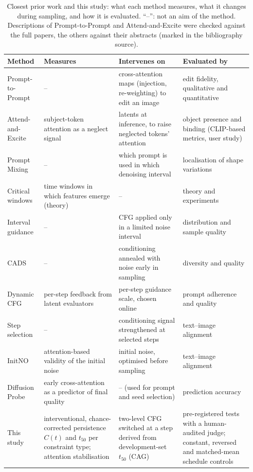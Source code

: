 \begin{table}[t]\centering\small
\caption{Closest prior work and this study: what each method measures, what it changes during sampling, and how it is evaluated. ``--'': not an aim of the method. Descriptions of Prompt-to-Prompt and Attend-and-Excite were checked against the full papers, the others against their abstracts (marked in the bibliography source).}\label{tab:related}
\begin{tabular}{p{2.9cm}p{3.7cm}p{3.7cm}p{3.7cm}}
\toprule
Method & Measures & Intervenes on & Evaluated by \\
\midrule
Prompt-to-Prompt \citep{hertz2023p2p} & -- & cross-attention maps (injection, re-weighting) to edit an image & edit fidelity, qualitative and quantitative \\
Attend-and-Excite \citep{chefer2023attend} & subject-token attention as a neglect signal & latents at inference, to raise neglected tokens' attention & object presence and binding (CLIP-based metrics, user study) \\
Prompt Mixing \citep{patashnik2023mixing} & -- & which prompt is used in which denoising interval & localisation of shape variations \\
Critical windows \citep{li2024critical} & time windows in which features emerge (theory) & -- & theory and experiments \\
Interval guidance \citep{kynkaanniemi2024interval} & -- & CFG applied only in a limited noise interval & distribution and sample quality \\
CADS \citep{sadat2024cads} & -- & conditioning annealed with noise early in sampling & diversity and quality \\
Dynamic CFG \citep{dynamiccfg2025} & per-step feedback from latent evaluators & per-step guidance scale, chosen online & prompt adherence and quality \\
Step selection \citep{grimal2025step} & -- & conditioning signal strengthened at selected steps & text--image alignment \\
InitNO \citep{guo2024initno} & attention-based validity of the initial noise & initial noise, optimised before sampling & text--image alignment \\
Diffusion Probe \citep{diffusionprobe2026} & early cross-attention as a predictor of final quality & -- (used for prompt and seed selection) & prediction accuracy \\
\midrule
This study & interventional, chance-corrected persistence $C(t)$ and $t_{50}$ per constraint type; attention stabilisation & two-level CFG switched at a step derived from development-set $t_{50}$ (CAG) & pre-registered tests with a human-audited judge; constant, reversed and matched-mean schedule controls \\
\bottomrule
\end{tabular}
\end{table}
